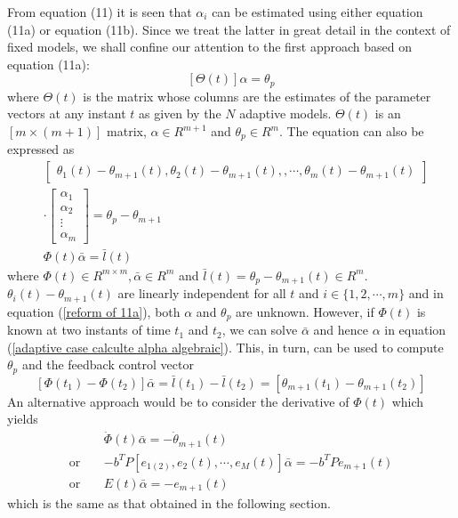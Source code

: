 \documentclass[conference]{IEEEtran}
\begin{document}
From equation (11) it is seen that $\alpha_{i}$ can be estimated using either equation (11a) or equation (11b). Since we treat the latter in great detail in the context of fixed models, we shall confine our attention to the first approach based on equation (11a):
\begin{equation}
\label{equation of 11a}
[\Theta(t)]\alpha=\theta_{p}
\end{equation}
where $\Theta(t)$ is the matrix whose columns are the estimates of the parameter vectors at any instant $t$ as given by the $N$ adaptive models. $\Theta(t)$ is an $[m\times (m+1)]$ matrix, $\alpha\in R^{m+1}$ and $\theta_{p}\in R^{m}$. The equation can also be expressed as
\begin{equation}
\label{reform of 11a}
\begin{split}
&\left[\begin{array}{c}\theta_{1}(t)-\theta_{m+1}(t),\theta_{2}(t)-\theta_{m+1}(t),,\cdots,\theta_{m}(t)-\theta_{m+1}(t)\end{array}\right]\\
&\cdot\left[\begin{array}{l}\alpha_{1}\\ \alpha_{2}\\ \vdots \\\alpha_{m}\end{array}\right]=\theta_{p}-\theta_{m+1}\\
&\Phi(t)\bar{\alpha}=\bar{l}(t)
\end{split}
\end{equation}
where $\Phi(t)\in R^{m\times m}, \bar{\alpha}\in R^{m}$ and $\bar{l}(t)=\theta_{p}-\theta_{m+1}(t)\in R^{m}$. $\theta_{i}(t)-\theta_{m+1}(t)$ are linearly independent for all $t$ and $i\in\{1,2,\cdots,m\}$ and in equation (\ref{reform of 11a}), both $\alpha$ and $\theta_{p}$ are unknown. However, if $\Phi(t)$ is known at two instants of time $t_{1}$ and $t_{2}$, we can solve $\bar{\alpha}$ and hence $\alpha$ in equation (\ref{adaptive case calculte alpha algebraic}). This, in turn, can be used to compute $\theta_{p}$ and the feedback control vector
\begin{equation}
\label{adaptive case calculte alpha algebraic}
[\Phi(t_{1})-\Phi(t_{2})]\bar{\alpha}=\bar{l}(t_{1})-\bar{l}(t_{2})=[\theta_{m+1}(t_{1})-\theta_{m+1}(t_{2})]
\end{equation}
An alternative approach would be to consider the derivative of $\Phi(t)$ which yields
\begin{equation}
\begin{split}
\label{}
&\dot{\Phi}(t)\bar{\alpha}=-\dot{\theta}_{m+1}(t)\\
\text{or} \ \ \ \ \  &-b^{T}P[e_{1(2)},e_{2}(t),\cdots,e_{M}(t)]\bar{\alpha}=-b^{T}Pe_{m+1}(t)\\
\text{or} \ \ \ \ \  &E(t)\bar{\alpha}=-e_{m+1}(t)
\end{split}
\end{equation}
which is the same as that obtained in the following section.
\end{document}
